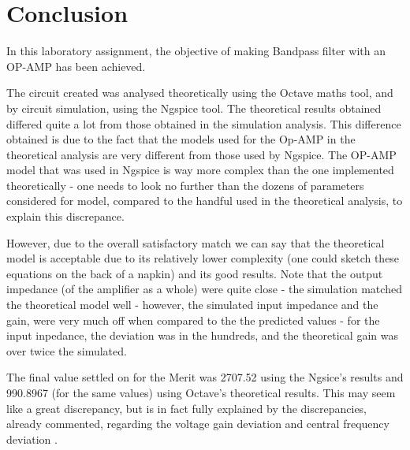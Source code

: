 \section{Conclusion}
\label{sec:conclusion}

In this laboratory assignment, the objective of making Bandpass filter with an OP-AMP has been achieved.\par
The circuit created was analysed theoretically using the Octave maths tool, and by circuit simulation, using the
Ngspice tool. The theoretical results obtained differed quite a lot from those obtained in the simulation analysis. This difference obtained is due to the fact that the models used for the Op-AMP in the theoretical analysis are very different from those used by Ngspice. The OP-AMP model that was used in Ngspice is way more complex than the one implemented theoretically - one needs to look no further than the dozens of parameters considered for model, compared to the handful used in the theoretical analysis, to explain this discrepance. 

However, due to the overall satisfactory match we can say that the theoretical model is acceptable due to its relatively lower complexity (one could sketch these equations on the back of a napkin) and its good results. Note that the output impedance (of the amplifier as a whole) were quite close - the simulation matched the theoretical model well - however, the simulated input impedance and the gain, were very much off when compared to the the predicted values - for the input inpedance, the deviation was in the hundreds, and the theoretical gain was over twice the simulated.\par
The final value settled on for the Merit was 2707.52 using the Ngsice's results and 990.8967 (for the same values) using Octave's theoretical results. This may seem like a great discrepancy, but is in fact fully explained by the discrepancies, already commented, regarding the voltage gain deviation and central frequency deviation .

